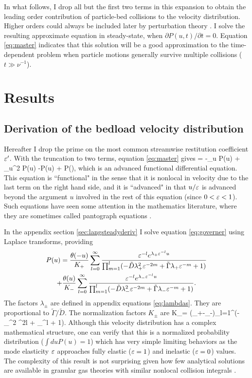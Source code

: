In what follows, I drop all but the first two terms in this expansion to obtain the leading order contribution of particle-bed collisions to the velocity distribution.
Higher orders could always be included later by perturbation theory \citep{Morse1953}.
I solve the resulting approximate equation in steady-state, when $\partial P(u,t)/\partial t = 0$. Equation \ref{eq:master} indicates that this solution will be a good approximation to the time-dependent problem when particle motions generally survive multiple collisions ($t\gg \nu^{-1}$).

\section{Results}
\label{sec:langresults}

\subsection{Derivation of the bedload velocity distribution}
\label{sec:langsolution}
Hereafter I drop the prime on the most common streamwise restitution coefficient $\varepsilon'$.
With the truncation to two terms, equation \ref{eq:master} gives 
 = -\tilde{\Gamma}\partial_u P(u) + \partial_u^2 P(u) -P(u) +  P\big(\big),\label{eq:governer} \ee
which is an advanced functional differential equation. This equation is ``functional" in the sense that it is nonlocal in velocity due to the last term on the right hand side, and it is ``advanced" in that $u/\varepsilon$ is advanced beyond the argument $u$ involved in the rest of this equation (since $0<\varepsilon<1$).
Such equations have seen some attention in the mathematics literature, where they are sometimes called pantograph equations \citep{Hall1989, Kim1998,Zaidi2015}.

In the appendix section \ref{sec:langsteadyderiv} I solve equation \ref{eq:governer} using Laplace transforms, providing
\begin{multline} P(u) = \frac{\theta(-u)}{K_+}\sum_{l=0}^\infty \frac{\varepsilon^{-l}e^{\lambda_+\varepsilon^{-l}u}}{\prod_{m=1}^l(-\tilde{D} \lambda_+^2 \varepsilon^{-2m} + \tilde{\Gamma} \lambda_+ \varepsilon^{-m} + 1) } 
	\\+ \frac{\theta(u)}{K_-}\sum_{l=0}^\infty \frac{\varepsilon^{-l}e^{\lambda_-\varepsilon^{-l}u}}{\prod_{m=1}^l(- \tilde{D} \lambda_-^2 \varepsilon^{-2m} + \tilde{\Gamma} \lambda_- \varepsilon^{-m} + 1) } \label{eq:steadystate}. \end{multline}
The factors $\lambda_\pm$ are defined in appendix equations \ref{eq:lambdas}. They are proportional to $\tilde{\Gamma}/\tilde{D}$. 
The normalization factors $K_\pm$ are 
\be K_\pm = (\lambda_+-\lambda_-)\prod_{l=1}^\infty (- \lambda_\pm^2 \ve^{2l} +\tilde{\Gamma} \lambda_\pm \ve^{l} + 1). \ee
Although this velocity distribution has a complex mathematical structure, one can verify that this is a normalized probability distribution ($\int du P(u) = 1$) which has very simple limiting behaviors as the mode elasticity $\varepsilon$ approaches fully elastic ($\varepsilon=1$) and inelastic ($\varepsilon = 0$) values. The complexity of this result is not surprising given how few analytical solutions are available in granular gas theories with similar nonlocal collision integrals \citep[e.g.][]{Brilliantov2004}.

